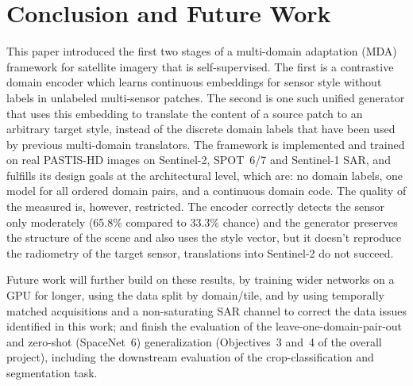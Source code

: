 \documentclass[runningheads]{llncs}
\begin{document}
\section{Conclusion and Future Work}
This paper introduced the first two stages of a multi-domain adaptation (MDA) framework for satellite imagery that is self-supervised. The first is a contrastive domain encoder which learns continuous embeddings for sensor style without labels in unlabeled multi-sensor patches. The second is one such unified generator that uses this embedding to translate the content of a source patch to an arbitrary target style, instead of the discrete domain labels that have been used by previous multi-domain translators. The framework is implemented and trained on real PASTIS-HD images on Sentinel-2, SPOT~6/7 and Sentinel-1 SAR, and fulfills its design goals at the architectural level, which are: no domain labels, one model for all ordered domain pairs, and a continuous domain code. The quality of the measured is, however, restricted. The encoder correctly detects the sensor only moderately (65.8\% compared to 33.3\% chance) and the generator preserves the structure of the scene and also uses the style vector, but it doesn't reproduce the radiometry of the target sensor, translations into Sentinel-2 do not succeed.

Future work will further build on these results, by training wider networks on a GPU for longer, using the data split by domain/tile, and by using temporally matched acquisitions and a non-saturating SAR channel to correct the data issues identified in this work; and finish the evaluation of the leave-one-domain-pair-out and zero-shot (SpaceNet~6) generalization (Objectives~3 and~4 of the overall project), including the downstream evaluation of the crop-classification and segmentation task.



\end{document}
